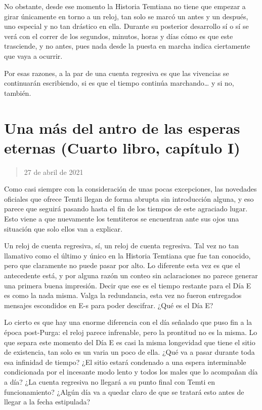 \documentclass[
  spanish,
]{book}
\begin{document}
No obstante, desde ese momento la Historia Temtiana no tiene que empezar a girar únicamente en torno a un reloj, tan solo se marcó un antes y un después, uno especial y no tan drástico en ella. Durante su posterior desarrollo sí o sí se verá con el correr de los segundos, minutos, horas y días cómo es que este trasciende, y no antes, pues nada desde la puesta en marcha indica ciertamente que vaya a ocurrir.

Por esas razones, a la par de una cuenta regresiva es que las vivencias se continuarán escribiendo, si es que el tiempo continúa marchando\ldots{} y si no, también.

\hypertarget{una-muxe1s-del-antro-de-las-esperas-eternas-cuarto-libro-capuxedtulo-i}{%
\section{Una más del antro de las esperas eternas (Cuarto libro, capítulo I)}\label{una-muxe1s-del-antro-de-las-esperas-eternas-cuarto-libro-capuxedtulo-i}}

\begin{quote}
27 de abril de 2021
\end{quote}

Como casi siempre con la consideración de unas pocas excepciones, las novedades oficiales que ofrece Temti llegan de forma abrupta sin introducción alguna, y eso parece que seguirá pasando hasta el fin de los tiempos de este agraciado lugar. Esto viene a que nuevamente los temtiteros se encuentran ante sus ojos una situación que solo ellos van a explicar.

Un reloj de cuenta regresiva, sí, un reloj de cuenta regresiva. Tal vez no tan llamativo como el último y único en la Historia Temtiana que fue tan conocido, pero que claramente no puede pasar por alto. Lo diferente esta vez es que el antecedente está, y por alguna razón un conteo sin aclaraciones no parece generar una primera buena impresión. Decir que ese es el tiempo restante para el Día E es como la nada misma. Valga la redundancia, esta vez no fueron entregados mensajes escondidos en E-s para poder descifrar. ¿Qué es el Día E?

Lo cierto es que hay una enorme diferencia con el día señalado que puso fin a la época post-Purga: el reloj parece infrenable, pero la prontitud no es la misma. Lo que separa este momento del Día E es casi la misma longevidad que tiene el sitio de existencia, tan solo es un varia un poco de ella. ¿Qué va a pasar durante toda esa infinidad de tiempo? ¿El sitio estará condenado a una espera interminable condicionada por el incesante modo lento y todos los males que lo acompañan día a día? ¿La cuenta regresiva no llegará a su punto final con Temti en funcionamiento? ¿Algún día va a quedar claro de que se tratará esto antes de llegar a la fecha estipulada?
\end{document}
